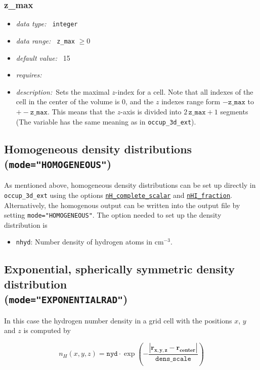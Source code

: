 \documentclass[a4paper,10pt]{article}
\begin{document}
\subsubsection{z\_max}
\label{hydopt:zmax}
\begin{itemize}
 \item \textit{data type:~} \texttt{integer}
 \item \textit{data range:~} \texttt{z\_max} $\ge0$
 \item \textit{default value:~} 15
 \item \textit{requires:~}
 \item \textit{description:~}Sets the maximal $z$-index for a cell. Note that
  all indexes of the cell in the center of the volume is 0, and the  $z$ 
  indexes range form $-\mathtt{z\_max}$ to $+-\mathtt{z\_max}$. This means that 
  the $z$-axis is divided into $2\, \mathtt{z\_max} +1$ segments (The variable 
  has the same meaning as in \texttt{occup\_3d\_ext}).
\end{itemize}


\subsection{Homogeneous density distributions (\texttt{mode="HOMOGENEOUS"})} 
As mentioned above, homogeneous density distributions can be set up directly in 
\texttt{occup\_3d\_ext} using the options 
\hyperref[opt:nhcompletescalar]{\texttt{nH\_complete\_scalar}} and
\hyperref[opt:nhifraction]{\texttt{nHI\_fraction}}. Alternatively, the 
homogenous output can be written into the output file by setting 
\texttt{mode="HOMOGENEOUS"}.
The option needed to set up the density distribution is 
\begin{itemize}
 \item \texttt{nhyd}: Number density of hydrogen atoms in $\mathrm{cm}^{-3}$.  
\end{itemize}

\subsection{Exponential, spherically symmetric density distribution\\ 
(\texttt{mode="EXPONENTIALRAD"})}
In this case the hydrogen number density in a grid cell with the positions $x$, 
$y$ and $z$ is computed by

\begin{equation}
 n_H(x,y,z) = \mathtt{nyd} \cdot \exp\left(- \frac{\left|\mathbf{r_{x,y,z}} - 
\mathbf{r_{center}} \right|}{\mathtt{dens\_scale}}\right)
\end{equation}
\end{document}
